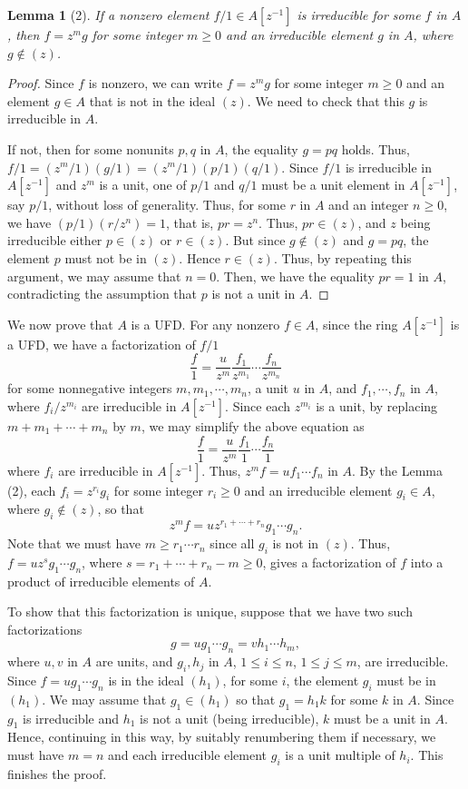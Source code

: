 \documentclass[11pt]{amsart}          %
\newtheorem*{lemma}{Lemma}
\begin{document}
\begin{lemma}[2] If a nonzero element $f/1 \in A[z^{-1}]$ is irreducible for some $f $ in $A$, then $f = z^m g$ for some integer $m \geq 0$ and an irreducible element $g$ in $A$, where $g \not \in (z)$.
\end{lemma}
\begin{proof}Since $f$ is nonzero, we can write $f = z^m g$ for some integer $m \geq 0$ and an element $g \in A$ that is not in the ideal $(z)$. We need to check that this $g$ is irreducible in $A$.

If not, then for some nonunits $p, q$ in $A$, the equality $g = pq$ holds. Thus, $f/1 = (z^m /1) (g/1) = (z^m /1) (p/1) (q/1)$. Since $f/1$ is irreducible in $A[z^{-1}]$ and $z^m$ is a unit, one of $p/1$ and $q/1$ must be a unit element in $A[z^{-1}]$, say $p/1$, without loss of generality. Thus, for some $r $ in $A$ and an integer $n \geq 0$, we have $(p/1) (r/z^n) = 1$, that is, $pr = z^n$. Thus, $pr \in (z)$, and $z$ being irreducible either $p \in (z)$ or $r \in (z)$. But since $g \not \in (z)$ and $g=pq$, the element $p$ must not be in $(z)$. Hence $r \in (z)$. Thus, by repeating this argument, we may assume that $n=0$. Then, we have the equality $pr = 1$ in $A$, contradicting the assumption that $p$ is not a unit in $A$.\end{proof}

We now prove that $A$ is a UFD. For any nonzero $f \in A$, since the ring $A[z^{-1}]$ is a UFD, we have a factorization of $f/1$
$$\frac{f}{1} = \frac{u}{z^m} \frac{f_1}{z^{m_1}} \cdots \frac{f_n}{z^{m_n}}$$ for some nonnegative integers $m, m_1, \cdots, m_n$, a unit $u$ in $A$, and $f_1, \cdots, f_n$ in $A$, where $f_i / z^{m_i}$ are irreducible in $A[z^{-1}]$. Since each $z^{m_i}$ is a unit, by replacing $m + m_1 + \cdots + m_n$ by $m$, we may simplify the above equation as
$$\frac{f}{1} = \frac{u}{z^m} \frac{f_1}{1} \cdots \frac{f_n}{1}$$ where $f_i$ are irreducible in $A[z^{-1}]$. Thus, $z^m f = u f_1 \cdots f_n$ in $A$. By the Lemma (2), each $f_i = z^{r_i} g_i$ for some integer $r_i \geq 0$ and an irreducible element $g_i \in A$, where $g_i \not \in (z)$, so that $$z^m f = u z^{r_1 + \cdots + r_n} g_1 \cdots g_n.$$ Note that we must have $m \geq r_1 \cdots r_n$ since all $g_i$ is not in $(z)$. Thus, $f = u z^s g_1 \cdots g_n$, where $s= r_1 + \cdots + r_n - m \geq 0$, gives a factorization of $f$ into a product of irreducible elements of $A$.

To show that this factorization is unique, suppose that we have two such factorizations
$$g = ug_1 \cdots g_n = v h_1 \cdots h_m,$$ where $u, v$ in $A$ are units, and $g_i, h_j$ in $A$, $1 \leq i \leq n$, $1 \leq j \leq m$, are irreducible. Since $f = ug_1 \cdots g_n $ is in the ideal $(h_1)$, for some $i$, the element $g_i$ must be in $(h_1)$. We may assume that $g_1 \in (h_1)$ so that $g_1 = h_1 k$ for some $k $ in $A$. Since $g_1$ is irreducible and $h_1$ is not a unit (being irreducible), $k$ must be a unit in $A$. Hence, continuing in this way, by suitably renumbering them if necessary, we must have $m = n$ and each irreducible element $g_i$ is a unit multiple of $h_i$. This finishes the proof.
\end{document}
